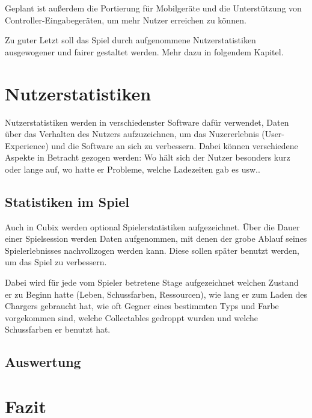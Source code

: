 \documentclass[a4paper,ngerman,12pt]{report}
\begin{document}
Geplant ist außerdem die Portierung für Mobilgeräte und die Unterstützung von Controller-Eingabegeräten, um mehr Nutzer erreichen zu können.

Zu guter Letzt soll das Spiel durch aufgenommene Nutzerstatistiken ausgewogener und fairer gestaltet werden. Mehr dazu in folgendem Kapitel.





\chapter{Nutzerstatistiken}
\label{chapt:userStats}

Nutzerstatistiken werden in verschiedenster Software dafür verwendet, Daten über das Verhalten des Nutzers aufzuzeichnen, um das Nuzererlebnis (User-Experience) und die Software an sich zu verbessern. Dabei können verschiedene Aspekte in Betracht gezogen werden: Wo hält sich der Nutzer besonders kurz oder lange auf, wo hatte er Probleme, welche Ladezeiten gab es usw..




\section{Statistiken im Spiel}

Auch in Cubix werden optional Spielerstatistiken aufgezeichnet. Über die Dauer einer Spielsession werden Daten aufgenommen, mit denen der grobe Ablauf seines Spielerlebnisses nachvollzogen werden kann. Diese sollen später benutzt werden, um das Spiel zu verbessern.

Dabei wird für jede vom Spieler betretene Stage aufgezeichnet welchen Zustand er zu Beginn hatte (Leben, Schussfarben, Ressourcen), wie lang er zum Laden des Chargers gebraucht hat, wie oft Gegner eines bestimmten Typs und Farbe vorgekommen sind, welche Collectables gedroppt wurden und welche Schussfarben er benutzt hat.




\section{Auswertung}

\lipsum[1]




\chapter{Fazit}
\end{document}
